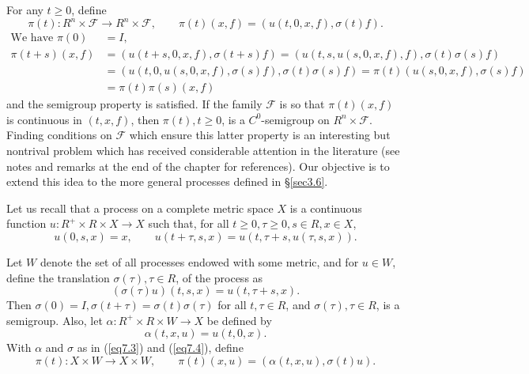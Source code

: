 \documentclass{surv-l}
\theoremstyle{plain}
\theoremstyle{definition}
\numberwithin{equation}{section}
\numberwithin{figure}{chapter}
\begin{document}
For any $t\geq 0$, define
\begin{equation}\label{eq1.2}
\pi(t)\!:R^{n}\times \mathcal{F}\rightarrow R^{n}\times \mathcal{F},\qquad \pi(t)(x,f)=(u(t,0,x,f),\sigma(t)f).
\end{equation}
\begin{align*}
\text{We have } \pi(0)&=I,\\
\pi(t+s)(x,f)&=(u(t+s,0,x,f),\sigma(t+s)f)=(u(t,s,u(s,0,x,f),f),\sigma(t)\sigma(s)f)\\
&=(u(t,0,u(s,0,x,f),\sigma(s)f),\sigma(t)\sigma(s)f)=\pi(t)(u(s,0,x,f),\sigma(s)f)\\
&=\pi(t)\pi(s)(x,f)
\end{align*}
and the semigroup property is satisfied. If the family $\mathcal{F}$ is so that $\pi(t)(x,f)$ is continuous in $(t,x,f)$, then $\pi(t),t\geq 0$, is a $C^{0}$-semigroup on $R^{n}\times \mathcal{F}$. Finding conditions on $\mathcal{F}$ which ensure this latter property is an interesting but nontrival problem which has received considerable attention in the literature (see notes and remarks at the end of the chapter for references). Our objective is to extend this idea to the more general processes defined in \S\ref{sec3.6}.

Let us recall that a process on a complete metric space $X$ is a continuous function $u\!:R^{+}\times R\times X\rightarrow X$ such that, for all $t\geq 0,\tau\geq 0,s\in R,x\in X$,
\begin{equation*}
u(0,s,x)=x,\qquad u(t+\tau,s,x)=u(t,\tau+s,u(\tau,s,x)).
\end{equation*}

Let $W$ denote the set of all processes endowed with some metric, and for $u\in W$, define the translation $\sigma(\tau),\tau\in R$, of the process as
\begin{equation}\label{eq7.3}
(\sigma(\tau)u)(t, s, x)=u(t, \tau+s, x).
\end{equation}
Then $\sigma(0)=I,\sigma(t+\tau)=\sigma(t)\sigma(\tau)$ for all $t,\tau\in R$, and $\sigma(\tau),\tau\in R$, is a semigroup. Also, let $\alpha\!:R^{+}\times R\times W\rightarrow X$ be defined by
\begin{equation}\label{eq7.4}
\alpha(t,x,u)=u(t,0,x).
\end{equation}
With $\alpha$ and $\sigma$ as in (\ref{eq7.3}) and (\ref{eq7.4}), define
\begin{equation}\label{eq7.5}
\pi(t)\!:X\times W\rightarrow X\times W,\qquad \pi(t)(x,u)=(\alpha(t,x,u),\sigma(t)u).
\end{equation}
\end{document}
